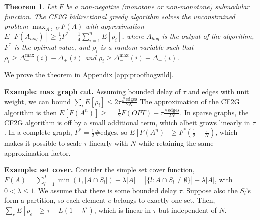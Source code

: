 \documentclass{article} %
\newcommand{\hogwild}{CF2G}
\newtheorem{thm}{Theorem}[section]
\begin{document}
\begin{thm}\label{thm:randomapprox} Let $F$ be a non-negative (monotone or non-monotone) submodular function.
The \hogwild{} bidirectional greedy algorithm solves the unconstrained problem $\max_{A\subset V} F(A)$ with approximation
$
E[F(A_{hog})] \geq \frac{1}{2}F^* - \frac{1}{4}\sum_{i=1}^n E[\rho_i]$,
where $A_{hog}$ is the output of the algorithm, $F^*$ is the optimal value, and $\rho_i$ is a random variable such that $\rho_i \geq \Delta_+^{\max}(i) - \Delta_+(i)$ and $\rho_i \geq \Delta_-^{\max}(i) - \Delta_-(i)$.
\end{thm}

We prove the theorem in Appendix \ref{app:proofhogwild}.



\textbf{Example: max graph cut.}
Assuming bounded delay of $\tau$ and edges with unit weight, we can bound $\sum_i E[\rho_i] \leq 2\tau\frac{\text{\#edges}}{2N}$
The approximation of the \hogwild{} algorithm is then $E[F(A^n)] \geq = \frac{1}{2} F(OPT) - \tau\frac{\#\text{edges}}{2N}$.
In sparse graphs, the \hogwild{} algorithm is off by a small additional term, which albeit grows linearly in $\tau$.
In a complete graph, $F^* = \frac{1}{2}\#\text{edges}$, so $E[F(A^n)] \geq F^*\left(\frac{1}{2} - \frac{\tau}{N}\right)$, which makes it possible to scale $\tau$ linearly with $N$ while retaining the same approximation factor.


\textbf{Example: set cover.}
Consider the simple set cover function,
$F(A) = \sum_{l=1}^L \min(1,|A\cap S_l|) - \lambda|A| = |\{l: A\cap S_l \neq\emptyset\}| - \lambda|A|$,
with $0 < \lambda \leq 1$.
We assume that there is some bounded delay $\tau$.
Suppose also the $S_l$'s form a partition, so each element $e$ belongs to exactly one set.
Then, $\sum_e E[\rho_e] \geq \tau + L(1-\lambda^\tau)$, which is linear in $\tau$ but independent of $N$.
\end{document}
